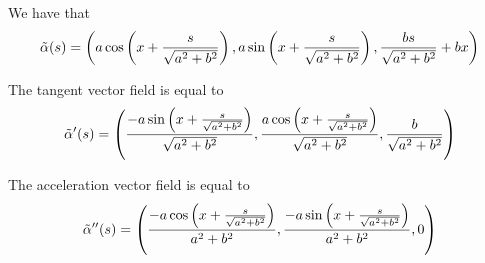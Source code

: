 \documentclass[12pt, answers]{exam}
\begin{document}
\begin{questions}
\begin{parts}
            \begin{solution}
            We have that \[\Tilde{\alpha}(s) = \left(a\cos\left(x + \frac{s}{\sqrt{a^2+b^2}}\right), a\sin\left(x + \frac{s}{\sqrt{a^2+b^2}}\right), \frac{bs}{\sqrt{a^2+b^2}} + bx\right)\]

            The tangent vector field is equal to
            \begin{align*}
                \Tilde{\alpha}'(s) = \left(\frac{-a\sin\left( x + \frac{s}{\sqrt{a^2 + b^2}}\right)}{\sqrt{a^2+b^2}}, \frac{a\cos\left( x + \frac{s}{\sqrt{a^2 + b^2}}\right)}{\sqrt{a^2+b^2}},\frac{b}{\sqrt{a^2+b^2}}\right)
            \end{align*}

            The acceleration vector field is equal to
            \begin{align*}
                \Tilde{\alpha}''(s) = \left( \frac{-a\cos\left( x + \frac{s}{\sqrt{a^2 + b^2}}\right)}{a^2+b^2}, \frac{-a\sin\left( x + \frac{s}{\sqrt{a^2 + b^2}}\right)}{a^2+b^2}, 0 \right)
            \end{align*}
            \end{solution}


\end{parts}
\end{questions}
\end{document}
